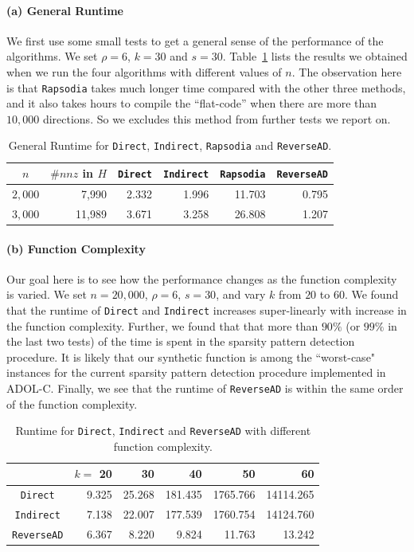 \documentclass[11pt, twocolumn]{article}
\begin{document}
\paragraph{(a) General Runtime} We first use some small tests to get a general sense of the performance of the algorithms. We set $\rho = 6$, $k = 30$ and $s = 30$. 
Table~\ref{tab:general} lists the results we obtained when
we run the four algorithms with different values of $n$.  The observation here is that
{\tt Rapsodia} takes much longer time compared with the other three methods, and it also takes hours to compile the ``flat-code'' when there are more than $10,000$ directions. 
So we excludes this method from further tests we report on.
\begin{table}[htbp]
\begin{center}
\begin{tabular}{ | c | r | r | r | r | r |}
\hline
$n$ & $\#nnz$ in $H$ & {\tt Direct} & {\tt Indirect} & {\tt Rapsodia} & {\tt ReverseAD} \\
\hline
$2,000$ & 7,990 & 2.332 & 1.996 & 11.703 & 0.795 \\
$3,000$ & 11,989 & 3.671 & 3.258 & 26.808 & 1.207\\
\hline 
\end{tabular}
\caption{General Runtime for {\tt Direct}, {\tt Indirect}, {\tt Rapsodia} and {\tt ReverseAD}.}
\label{tab:general}
\end{center}
\end{table}

\paragraph{(b) Function Complexity} 
Our goal here is to see how the performance changes as the function complexity is varied.
We set $n = 20,000$, $\rho = 6$, $s = 30$, and vary $k$ from $20$ to $60$. 
We found that the runtime of {\tt Direct} and {\tt Indirect} increases super-linearly with increase in the function complexity. Further, we found that that more than $90\%$ (or $99\%$ in the last two tests) of the time is spent in the sparsity pattern detection procedure. It is likely that our synthetic function is among the ``worst-case" instances for the current sparsity pattern detection procedure implemented in ADOL-C.  Finally, we see that the runtime of {\tt ReverseAD} is within the same order of the function complexity.
\begin{table}[htbp]
\begin{center}
\begin{tabular}{ | c | r | r | r | r | r |}
\hline
 & $k=$ 20 & 30 & 40 & 50 & 60 \\
\hline
{\tt Direct} & 9.325 & 25.268 &181.435 &1765.766 & 14114.265\\
{\tt Indirect} & 7.138 & 22.007 & 177.539 & 1760.754 & 14124.760\\
{\tt ReverseAD}  & 6.367 & 8.220 & 9.824 & 11.763 & 13.242\\
\hline 
\end{tabular}
\caption{Runtime for {\tt Direct}, {\tt Indirect} and {\tt ReverseAD} with different function complexity.}
\label{tab:complexity}
\end{center}
\end{table}
\end{document}

